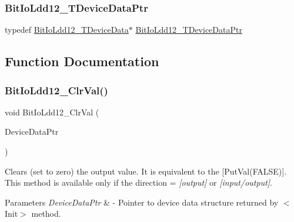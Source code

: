 \subsubsection{\texorpdfstring{Bit\+Io\+Ldd12\+\_\+\+T\+Device\+Data\+Ptr}{BitIoLdd12\_TDeviceDataPtr}}
{\footnotesize\ttfamily typedef \hyperlink{struct_bit_io_ldd12___t_device_data}{Bit\+Io\+Ldd12\+\_\+\+T\+Device\+Data}$\ast$ \hyperlink{group___bit_io_ldd12__module_gaf89bedffb46e6db2cef354573301a268}{Bit\+Io\+Ldd12\+\_\+\+T\+Device\+Data\+Ptr}}



\subsection{Function Documentation}
\mbox{\label{group___bit_io_ldd12__module_ga8a874582bd5c8203b3dfb47ea504ae12}} 
\subsubsection{\texorpdfstring{Bit\+Io\+Ldd12\+\_\+\+Clr\+Val()}{BitIoLdd12\_ClrVal()}}
{\footnotesize\ttfamily void Bit\+Io\+Ldd12\+\_\+\+Clr\+Val (\begin{DoxyParamCaption}\item[{\hyperlink{group___p_e___types__module_gac5cf1362f1f0e3a2ce71b1bf2276d091}{L\+D\+D\+\_\+\+T\+Device\+Data} $\ast$}]{Device\+Data\+Ptr }\end{DoxyParamCaption})}



Clears (set to zero) the output value. It is equivalent to the \mbox{[}Put\+Val(\+F\+A\+L\+S\+E)\mbox{]}. This method is available only if the direction = {\itshape \mbox{[}output\mbox{]}} or {\itshape \mbox{[}input/output\mbox{]}}. 


\begin{DoxyParams}{Parameters}
{\em Device\+Data\+Ptr} & -\/ Pointer to device data structure returned by $<$\+Init$>$ method. \\
\hline
\end{DoxyParams}
\mbox{\label{group___bit_io_ldd12__module_gab808ab6ca05818b3bfaba89eee1397b0}} 
